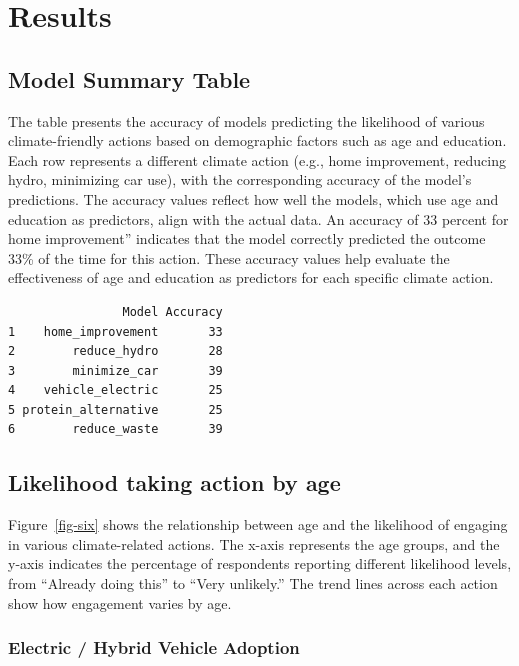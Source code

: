 \documentclass[
  letterpaper,
  DIV=11,
  numbers=noendperiod]{scrartcl}
\begin{document}
\section{Results}\label{results}

\subsection{Model Summary Table}\label{model-summary-table}

The table presents the accuracy of models predicting the likelihood of
various climate-friendly actions based on demographic factors such as
age and education. Each row represents a different climate action (e.g.,
home improvement, reducing hydro, minimizing car use), with the
corresponding accuracy of the model's predictions. The accuracy values
reflect how well the models, which use age and education as predictors,
align with the actual data. An accuracy of 33 percent for home
improvement'' indicates that the model correctly predicted the outcome
33\% of the time for this action. These accuracy values help evaluate
the effectiveness of age and education as predictors for each specific
climate action.

\begin{verbatim}
                Model Accuracy
1    home_improvement       33
2        reduce_hydro       28
3        minimize_car       39
4    vehicle_electric       25
5 protein_alternative       25
6        reduce_waste       39
\end{verbatim}

\subsection{Likelihood taking action by
age}\label{likelihood-taking-action-by-age}

Figure~\ref{fig-six} shows the relationship between age and the
likelihood of engaging in various climate-related actions. The x-axis
represents the age groups, and the y-axis indicates the percentage of
respondents reporting different likelihood levels, from ``Already doing
this'' to ``Very unlikely.'' The trend lines across each action show how
engagement varies by age.

\subsubsection{Electric / Hybrid Vehicle
Adoption}\label{electric-hybrid-vehicle-adoption}
\end{document}
